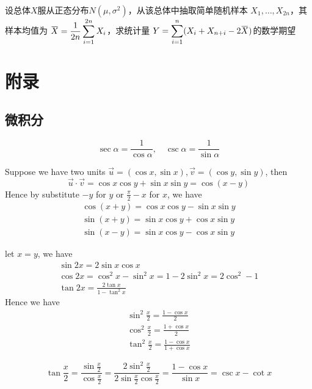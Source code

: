 \documentclass{article}
\begin{document}
\begin{examplle}[]
设总体\(X\)服从正态分布\(N(\mu,\sigma^2)\)，从该总体中抽取简单随机样本
\(X_1,\dots,X_{2n}\)，其样本均值为
\(\displaystyle\bbar{X}=\frac{1}{2n}\sum_{i=1}^{2n}X_i\)，求统计量
\(Y=\displaystyle\sum_{i=1}^n(X_i+X_{n+i}-2\bbar{X})\)的数学期望
\end{examplle}
\section{附录}
\label{sec:org8ab5282}
\subsection{微积分}
\label{sec:orgbb1ff0b}
   \begin{equation*}
\sec\alpha=\frac{1}{\cos\alpha},\quad\csc\alpha=\frac{1}{\sin\alpha}
\end{equation*}

Suppose we have two units \(\vec{u}=(\cos x,\sin x),\vec{v}=(\cos y,\sin
   y)\), then
\begin{equation*}
\vec{u}\cdot\vec{v}=\cos x\cos y+\sin x\sin y=\cos(x-y)
\end{equation*}
Hence by substitute \(-y\) for \(y\) or \(\frac{\pi}{2}-x\) for \(x\), we have
\begin{gather*}
\cos(x+y)=\cos x\cos y-\sin x\sin y\\
\sin(x+y)=\sin x\cos y+\cos x\sin y\\
\sin(x-y)=\sin x\cos y-\cos x\sin y
\end{gather*}

let \(x=y\), we have
\begin{gather*}
\sin 2x=2\sin x\cos x\\
\cos 2x=\cos^2x-\sin^2x=1-2\sin^2 x=2\cos^2-1\\
\tan 2x=\frac{2\tan x}{1-\tan^2x}
\end{gather*}
Hence we have
\begin{gather*}
\sin^2\frac{x}{2}=\frac{1-\cos x}{2}\\
\cos^2\frac{x}{2}=\frac{1+\cos x}{2}\\
\tan^2\frac{x}{2}=\frac{1-\cos x}{1+\cos x}
\end{gather*}

\begin{equation*}
\tan\frac{x}{2}=\frac{\sin\frac{x}{2}}{\cos\frac{x}{2}}=
\frac{2\sin^2\frac{x}{2}}{2\sin\frac{x}{2}\cos\frac{x}{2}}=
\frac{1-\cos x}{\sin x}=\csc x-\cot x
\end{equation*}
\end{document}
